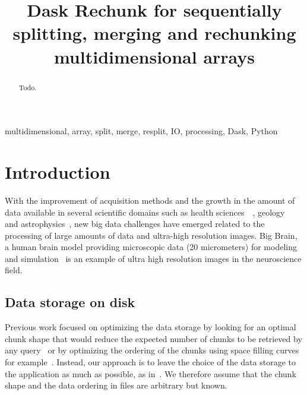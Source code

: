 \documentclass[conference]{IEEEtran}
\begin{document}
\title{ Dask Rechunk for sequentially splitting, merging and rechunking multidimensional arrays }

\author{
}

\maketitle

\begin{abstract}
Todo.
\end{abstract}

\begin{IEEEkeywords}
multidimensional, array, split, merge, resplit, IO, processing, Dask, Python
\end{IEEEkeywords}

\section{Introduction}
With the improvement of acquisition methods and the growth in the amount of data
available in several scientific domains such as health
sciences~\cite{bigdata_health}~\cite{Amunts1472}, geology~\cite{big_data_geology}
and astrophysics~\cite{biguniverse}, new big data challenges have emerged related
to the processing of large amounts of data and ultra-high resolution
images. Big Brain, a human brain model providing microscopic data (20 micrometers) for
modeling and simulation~\cite{Amunts1472} is an example of ultra high resolution
images in the neuroscience field.

\subsection{Data storage on disk}
Previous work focused on optimizing the data storage by looking for an optimal
chunk shape that would reduce the expected number of chunks to be retrieved by
any query~\cite{optimal_chuking} or by optimizing the ordering of the chunks
using space filling curves for example~\cite{optimal_chuking, openconnectomecluster}.
Instead, our approach is to leave the choice of the
data storage to the application as much as possible, as in~\cite{seqalgorithms}.
We therefore assume that
the chunk shape and the data ordering in files are arbitrary but known.
\end{document}
